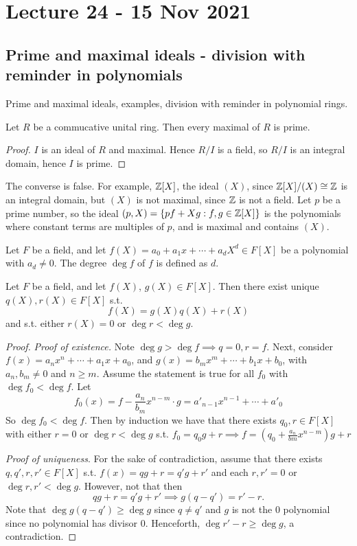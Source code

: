 \section{Lecture 24 - 15 Nov 2021}
\subsection{Prime and maximal ideals - division with reminder in polynomials}
Prime and maximal ideals, examples, division with reminder in polynomial rings.

\begin{corollary}
  Let $R$ be a commucative unital ring. Then every maximal of $R$ is prime.
  \label{cor:maximalPrime}
\end{corollary}
\begin{proof}
  $I$ is an ideal of $R$ and maximal. Hence $R/I$ is a field, so $R/I$ is an integral
  domain, hence $I$ is prime.
\end{proof}

\begin{example}
  The converse is false. For example, $\mathbb Z[X]$, the ideal $(X)$, since $\mathbb Z[X]/(X)\cong
  \mathbb Z$ is an integral domain, but $(X)$ is not maximal, since $\mathbb Z$ is not a field. Let
  $p$ be a prime number, so the ideal $(p,X)=\{pf+Xg: f,g\in\mathbb Z[X]\}$ is the polynomials
  where constant terms are multiples of $p$, and is maximal and contains $(X)$.
\end{example}

\begin{definition}
  Let $F$ be a field, and let $f(X)=a_0+a_1x+\cdots + a_d X^d\in F[X]$ be a polynomial
  with $a_d\neq 0$. The degree $\deg f$ of $f$ is defined as $d$.
  \label{<+label+>}
\end{definition}

\begin{theorem}
  Let $F$ be a field, and let $f(X)$, $g(X)\in F[X]$. Then there exist unique $q(X),
  r(X)\in F[X]$ s.t. 
  \[f(X)=g(X)q(X)+r(X)\]
  and s.t. either $r(X)=0$ or $\deg r < \deg g$.
  \label{thm:divisionReminderPolynomial}
\end{theorem}
\begin{proof}
  \emph{Proof of existence.} Note $\deg g> \deg f \implies q=0, r=f$. Next, consider
  $f(x)=a_nx^n+\cdots+a_1x+a_0$, and $g(x)=b_mx^m+\cdots+b_1x+b_0$, with $a_n,b_m\neq 0$
  and $n\geq m$. Assume the statement is true for all $f_0$ with $\deg f_0<\deg f$. Let 
  \[f_0(x)=f-\frac{a_n}{b_m}x^{n-m}\cdot g = a'_{n-1}x^{n-1}+\cdots+a'_0\]
  So $\deg f_0< \deg f$. Then by induction we have that there exists $q_0, r\in F[X]$ with
  either $r=0$ or $\deg r< \deg g$ s.t.  $f_0=q_0g + r \implies f=
  (q_0+\frac{a_n}{bm}x^{n-m})g + r$

  \emph{Proof of uniqueness}. For the sake of contradiction, assume that there exists
  $q,q',r,r'\in F[X]$ s.t. $f(x)=qg+r=q'g+r'$ and each $r,r'=0$ or $\deg r,r'<\deg g$.
  However, not that then 
  \[qg+r=q'g+r' \implies g(q-q')=r'-r.\]
  Note that $\deg g(q-q')\geq \deg g$ since $q\neq q'$ and $g$ is not the $0$ polynomial
  since no polynomial has divisor $0$. Henceforth, $\deg r'-r\geq \deg g$, a
  contradiction.
\end{proof}

